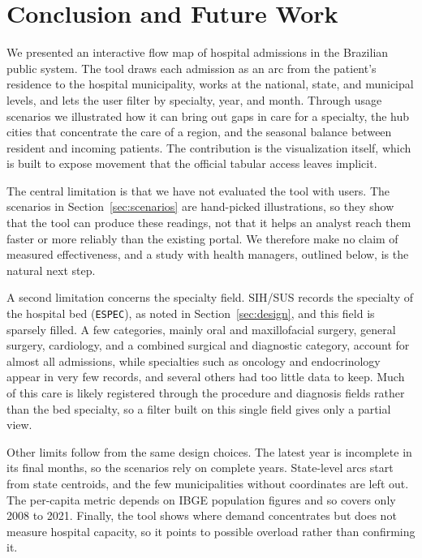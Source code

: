 \section{Conclusion and Future Work}

We presented an interactive flow map of hospital admissions in the Brazilian public system.
The tool draws each admission as an arc from the patient's residence to the hospital municipality, works at the national, state, and municipal levels, and lets the user filter by specialty, year, and month.
Through usage scenarios we illustrated how it can bring out gaps in care for a specialty, the hub cities that concentrate the care of a region, and the seasonal balance between resident and incoming patients.
The contribution is the visualization itself, which is built to expose movement that the official tabular access leaves implicit.

The central limitation is that we have not evaluated the tool with users.
The scenarios in Section~\ref{sec:scenarios} are hand-picked illustrations, so they show that the tool can produce these readings, not that it helps an analyst reach them faster or more reliably than the existing portal.
We therefore make no claim of measured effectiveness, and a study with health managers, outlined below, is the natural next step.

A second limitation concerns the specialty field.
SIH/SUS records the specialty of the hospital bed (\texttt{ESPEC}), as noted in Section~\ref{sec:design}, and this field is sparsely filled.
A few categories, mainly oral and maxillofacial surgery, general surgery, cardiology, and a combined surgical and diagnostic category, account for almost all admissions, while specialties such as oncology and endocrinology appear in very few records, and several others had too little data to keep.
Much of this care is likely registered through the procedure and diagnosis fields rather than the bed specialty, so a filter built on this single field gives only a partial view.

Other limits follow from the same design choices.
The latest year is incomplete in its final months, so the scenarios rely on complete years.
State-level arcs start from state centroids, and the few municipalities without coordinates are left out.
The per-capita metric depends on IBGE population figures and so covers only 2008 to 2021.
Finally, the tool shows where demand concentrates but does not measure hospital capacity, so it points to possible overload rather than confirming it.

